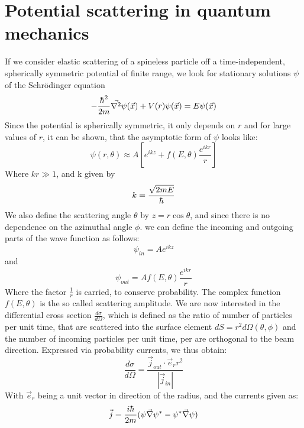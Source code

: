 \documentclass[a4paper]{article}
\newcommand{\hbbar}{{\raisebox{0.05ex}{$\mathchar '26$}\mkern -9mu\raisebox{-0.15ex}{$\mathchar '26$}\mkern -9muh}}
\begin{document}
\section{Potential scattering in quantum mechanics}
If we consider elastic scattering of a spineless particle off a
time-independent, spherically symmetric potential of finite range, we look for
stationary solutions $\psi$ of the Schrödinger equation
\begin{equation}
    -\frac{\hbbar^2}{2m}\Vec{\nabla^2}\psi(\Vec{x})+V(r)\psi(\Vec{x})=E\psi(\Vec{x})
\end{equation}
Since the potential is spherically symmetric, it only depends on $r$ and for
large values of $r$, it can be shown, that the asymptotic form of $\psi$ looks
like:
\begin{equation}
    \psi(r,\theta)\approx A[e^{ikz}+f(E,\theta)\frac{e^{ikr}}{r}]
\end{equation}
Where $kr\gg 1$, and k given by
\begin{equation}
    k=\frac{\sqrt{2mE}}{\hbbar}
\end{equation}
We also define the scattering angle $\theta$ by $z=r\cos{\theta}$, and since
there is no dependence on the azimuthal angle $\phi$. we can define the
incoming and outgoing parts of the wave function as follows:
\begin{equation}
    \psi_{in}=Ae^{ikz}
\end{equation}
and
\begin{equation}
    \psi_{out}=Af(E,\theta)\frac{e^{ikr}}{r}
\end{equation}
Where the factor $\frac{1}{r}$ is carried, to conserve probability. The complex
function $f(E,\theta)$ is the so called scattering amplitude. We are now
interested in the differential cross section $\frac{d\sigma}{d\Omega}$, which
is defined as the ratio of number of particles per unit time, that are
scattered into the surface element $dS=r^2d\Omega(\theta,\phi)$ and the number
of incoming particles per unit time, per are orthogonal to the beam direction.
Expressed via probability currents, we thus obtain:
\begin{equation}
    \frac{d\sigma}{d\Omega}=\frac{\Vec{j}_{out}\cdot \Vec{e}_rr^2}{|\Vec{j}_{in}|}
\end{equation}
With $\Vec{e}_r$ being a unit vector in direction of the radius, and the currents given as:
\begin{equation}
\Vec{j}=\frac{i\hbbar}{2m}(\psi\Vec{\nabla}\psi^*-\psi^*\Vec{\nabla}\psi)
\end{equation}
\end{document}
